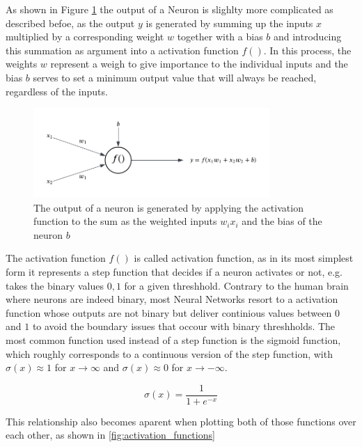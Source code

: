 As shown in Figure \ref{fig:neuron_calculations} the output of a Neuron is slighlty more complicated as described befoe, as the output $y$ is generated by summing up the inputs $x$ multiplied by a corresponding weight $w$ together with a bias $b$ and introducing this summation as argument into a activation function $f()$. In this process, the weights $w$ represent a weigh to give importance to the individual inputs and the bias $b$ serves to set a minimum output value that will always be reached, regardless of the inputs. 

\begin{figure}[h] 
	\centering
	\includegraphics[width=0.8\textwidth]{figures/modelling/perceptron_concept.png} %
	\caption{The output of a neuron is generated by applying the activation function to the sum as the weighted inputs $w_ix_i$ and the bias of the neuron $b$}
	\label{fig:neuron_calculations}
\end{figure}

The activation function $f()$ is called activation function, as in its most simplest form it represents a step function that decides if a neuron activates or not, e.g. takes the binary values ${0,1}$ for a given threshhold. Contrary to the human brain where neurons are indeed binary, most Neural Networks resort to a activation function whose outputs are not binary but deliver continious values between $0$ and $1$ to avoid the boundary issues that occour with binary threshholds. The most common function used instead of a step function is the sigmoid function, which roughly corresponds to a continuous version of the step function, with $\sigma(x) \approx 1$ for $x \to \infty$ and $\sigma(x) \approx 0$ for $x \to -\infty$.


\[
\sigma(x) = \frac{1}{1 + e^{-x}}
\]

This relationship also becomes aparent when plotting both of those functions over each other, as shown in \ref{fig:activation_functions}

